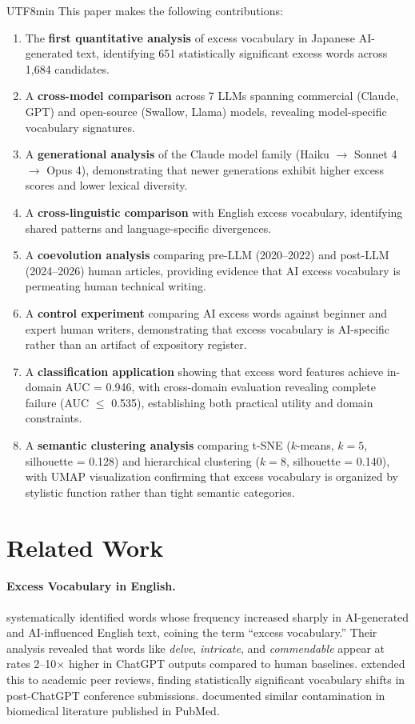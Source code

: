 \documentclass[11pt,a4paper]{article}
\begin{document}
\begin{CJK}{UTF8}{min}
This paper makes the following contributions:
\begin{enumerate}
    \item The \textbf{first quantitative analysis} of excess vocabulary in Japanese AI-generated text, identifying 651 statistically significant excess words across 1,684 candidates.
    \item A \textbf{cross-model comparison} across 7 LLMs spanning commercial (Claude, GPT) and open-source (Swallow, Llama) models, revealing model-specific vocabulary signatures.
    \item A \textbf{generational analysis} of the Claude model family (Haiku $\to$ Sonnet 4 $\to$ Opus 4), demonstrating that newer generations exhibit higher excess scores and lower lexical diversity.
    \item A \textbf{cross-linguistic comparison} with English excess vocabulary, identifying shared patterns and language-specific divergences.
    \item A \textbf{coevolution analysis} comparing pre-LLM (2020--2022) and post-LLM (2024--2026) human articles, providing evidence that AI excess vocabulary is permeating human technical writing.
    \item A \textbf{control experiment} comparing AI excess words against beginner and expert human writers, demonstrating that excess vocabulary is AI-specific rather than an artifact of expository register.
    \item A \textbf{classification application} showing that excess word features achieve in-domain AUC = 0.946, with cross-domain evaluation revealing complete failure (AUC $\leq$ 0.535), establishing both practical utility and domain constraints.
    \item A \textbf{semantic clustering analysis} comparing t-SNE ($k$-means, $k=5$, silhouette = 0.128) and hierarchical clustering ($k=8$, silhouette = 0.140), with UMAP visualization confirming that excess vocabulary is organized by stylistic function rather than tight semantic categories.
\end{enumerate}

\section{Related Work}

\paragraph{Excess Vocabulary in English.}
\citet{kobak2024vocabulary} systematically identified words whose frequency increased sharply in AI-generated and AI-influenced English text, coining the term ``excess vocabulary.'' Their analysis revealed that words like \textit{delve}, \textit{intricate}, and \textit{commendable} appear at rates 2--10$\times$ higher in ChatGPT outputs compared to human baselines. \citet{liang2024monitoring} extended this to academic peer reviews, finding statistically significant vocabulary shifts in post-ChatGPT conference submissions. \citet{gray2024chatgpt} documented similar contamination in biomedical literature published in PubMed.


\end{CJK}
\end{document}
